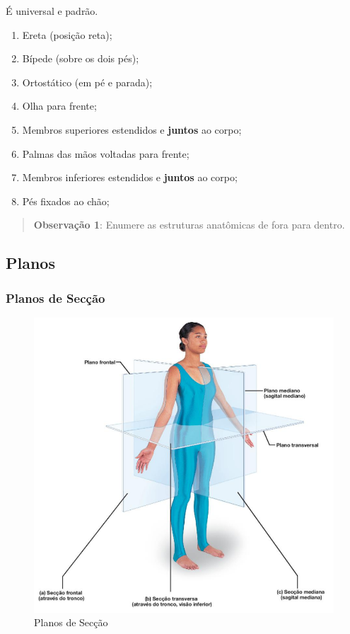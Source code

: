 \documentclass[
]{book}
\providecommand{\tightlist}{%
  \setlength{\itemsep}{0pt}\setlength{\parskip}{0pt}}
\begin{document}
É universal e padrão.

\begin{enumerate}
\def\labelenumi{\arabic{enumi}.}
\tightlist
\item
  Ereta (posição reta);
\item
  Bípede (sobre os dois pés);
\item
  Ortostático (em pé e parada);
\item
  Olha para frente;
\item
  Membros superiores estendidos e \textbf{juntos} ao corpo;
\item
  Palmas das mãos voltadas para frente;
\item
  Membros inferiores estendidos e \textbf{juntos} ao corpo;
\item
  Pés fixados ao chão;
\end{enumerate}

\begin{quote}
\textbf{Observação 1}: Enumere as estruturas anatômicas de fora para dentro.
\end{quote}

\hypertarget{planos}{%
\subsection{Planos}\label{planos}}

\hypertarget{planos-de-secuxe7uxe3o}{%
\subsubsection*{Planos de Secção}\label{planos-de-secuxe7uxe3o}}

\begin{figure}

{\centering \includegraphics[width=0.9\linewidth]{figuras/Aula2-2 - Planos de Seccao} 

}

\caption{Planos de Secção}\label{fig:unnamed-chunk-3}
\end{figure}
\end{document}
